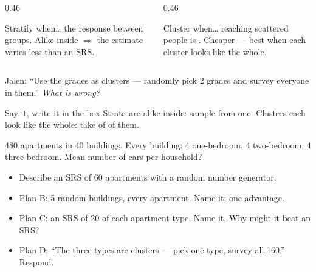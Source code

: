 \documentclass[aspectratio=169, 11pt]{beamer}
\begin{document}
\begin{frame}[t, plain]
  \vspace{4pt}
  \begin{columns}[t]
    \begin{column}{0.46\textwidth}
      \begin{block}{Stratify when\ldots}
        the response  between groups. Alike inside $\Rightarrow$ the estimate
        varies less than an SRS.
      \end{block}
    \end{column}
    \begin{column}{0.46\textwidth}
      \begin{block}{Cluster when\ldots}
        reaching scattered people is . Cheaper --- best when each cluster
        looks like the whole.
      \end{block}
    \end{column}
  \end{columns}
  \vspace{8pt}
  Jalen: ``Use the grades as clusters --- randomly pick 2 grades and survey everyone in
  them.'' \emph{What is wrong?}
  \vspace{8pt}
  \begin{block}{Say it, write it in the box}
    Strata are alike inside: sample from  one. Clusters each look like the whole:
    take  of  of them.
  \end{block}
\end{frame}

\begin{frame}[t, plain]
  480 apartments in 40 buildings. Every building: 4 one-bedroom, 4 two-bedroom, 4 three-bedroom.
  Mean number of cars per household?
  \begin{itemize}\setlength{\itemsep}{4pt}
    \item Describe an SRS of 60 apartments with a random number generator.
    \item Plan B: 5 random buildings, every apartment. Name it; one advantage.
    \item Plan C: an SRS of 20 of each apartment type. Name it. Why might it beat an SRS?
    \item Plan D: ``The three types are clusters --- pick one type, survey all 160.'' Respond.
  \end{itemize}
\end{frame}
\end{document}
